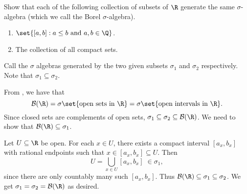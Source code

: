 \documentclass[12pt]{article}
\begin{document}
\begin{problem} \label{prb:borel-R}
    Show that each of the following collection of subsets of $\R$ generate
    the same $\sigma$-algebra (which we call the Borel $\sigma$-algebra).
    \begin{enumerate}[(1)]
        \item $\set{[a, b] : a \le b \text{ and } a, b \in \Q}$.
        \item The collection of all compact sets.
    \end{enumerate}
\end{problem}
\begin{solution}
    Call the $\sigma$ algebras generated by the two given subsets
    $\sigma_1$ and $\sigma_2$ respectively.
    Note that $\sigma_1 \subseteq \sigma_2$.

    From , we have that \[
        \B(\R) = \sigma\set{\text{open sets in } \R}
            = \sigma\set{\text{open intervals in } \R}.
    \] Since closed sets are complements of open sets,
    $\sigma_1 \subseteq \sigma_2 \subseteq \B(\R)$.
    We need to show that $\B(\R) \subseteq \sigma_1$.

    Let $U \subseteq \R$ be open.
    For each $x \in U$, there exists a compact interval $[a_x, b_x]$
    with rational endpoints such that $x \in [a_x, b_x] \subseteq U$.
    Then \[
        U = \bigcup_{x \in U} [a_x, b_x] \;\in \sigma_1,
    \] since there are only countably many such $[a_x, b_x]$.
    Thus $\B(\R) \subseteq \sigma_1 \subseteq \sigma_2$.
    We get $\sigma_1 = \sigma_2 = \B(\R)$ as desired.
\end{solution}
\end{document}
